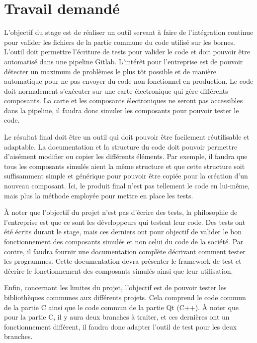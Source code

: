 \documentclass[a4paper]{article}
\begin{document}
\section{Travail demandé}%

L'objectif du stage est de réaliser un outil servant à faire de l'intégration
continue pour valider les fichiers de la partie commune du code utilisé sur les
bornes. L'outil doit permettre l'écriture de tests pour valider le code et doit
pouvoir être automatisé dans une pipeline Gitlab. L'intérêt pour l'entreprise
est de pouvoir détecter un maximum de problèmes le plus tôt possible et de
manière automatique pour ne pas envoyer du code non fonctionnel en production.
Le code doit normalement s'exécuter sur une carte électronique qui gère
différents composants. La carte et les composants électroniques ne seront pas
accessibles dans la pipeline, il faudra donc simuler les composants pour pouvoir
tester le code.

Le résultat final doit être un outil qui doit pouvoir être facilement
réutilisable et adaptable. La documentation et la structure du code doit pouvoir
permettre d'aisément modifier ou copier les différents éléments. Par exemple, il
faudra que tous les composants simulés aient la même structure et que cette
structure soit suffisamment simple et générique pour pouvoir être copiée pour la
création d'un nouveau composant. Ici, le produit final n'est pas tellement le
code en lui-même, mais plus la méthode employée pour mettre en place les tests.

À noter que l'objectif du projet n'est pas d'écrire des tests, la philosophie de
l'entreprise est que ce sont les développeurs qui testent leur code. Des tests
ont été écrits durant le stage, mais ces derniers ont pour objectif de valider
le bon fonctionnement des composants simulés et non celui du code de la société.
Par contre, il faudra fournir une documentation complète décrivant comment
tester les programmes. Cette documentation devra présenter le framework de test
et décrire le fonctionnement des composants simulés ainsi que leur utilisation.

Enfin, concernant les limites du projet, l'objectif est de pouvoir tester les
bibliothèques communes aux différents projets. Cela comprend le code commun de
la partie C ainsi que le code commun de la partie Qt (C++). À noter que pour la
partie C, il y aura deux branches à traiter, et ces dernières ont un
fonctionnement différent, il faudra donc adapter l'outil de test pour les deux
branches.
\end{document}
